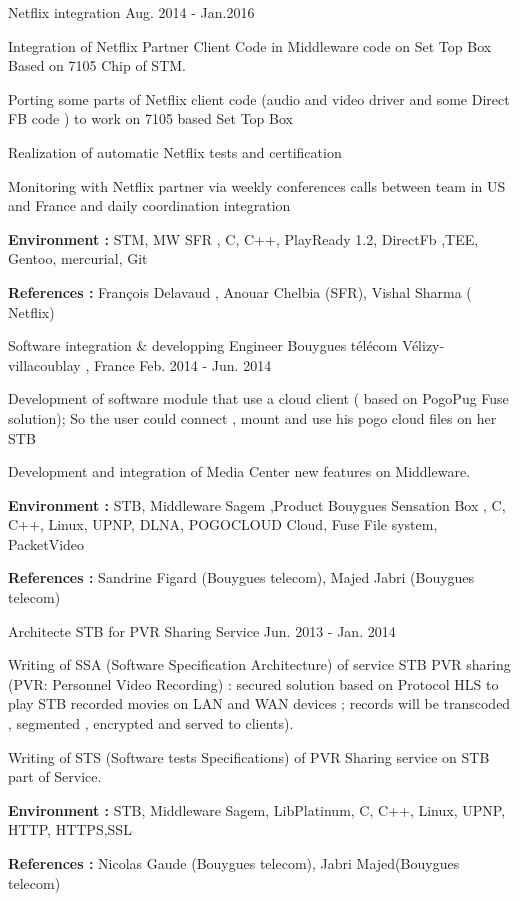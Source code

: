 \begin{cventries}
\cventry
{Netflix integration } %
{}{}
{Aug. 2014 - Jan.2016} %
{ %
\begin{cvitems}
\item {Integration of Netflix Partner Client Code in Middleware code on Set Top Box Based on 7105 Chip of STM.}
\item {Porting some parts of Netflix client code (audio and video driver  and some Direct FB code ) to work on 7105 based Set Top Box}
\item {Realization of automatic Netflix tests and certification }
\item {Monitoring with Netflix partner via weekly conferences calls between team in US and France and daily coordination integration}
\item { \textbf{Environment :}  STM, MW SFR , C, C++, PlayReady 1.2, DirectFb ,TEE, Gentoo, mercurial, Git}
\item { \textbf{References :} François Delavaud , Anouar Chelbia (SFR), Vishal Sharma ( Netflix)}
\end{cvitems}
}

\cventry
{Software integration \& developping Engineer} %
{Bouygues télécom} %
{Vélizy-villacoublay , France} %
{Feb. 2014 - Jun. 2014} %
{ %
\begin{cvitems}
\item {Development of software module that use a cloud client ( based on PogoPug Fuse solution); So the user could connect , mount  and use his pogo cloud files on her STB}
\item {Development and integration of Media Center new features on Middleware.}
\item { \textbf{Environment :} STB, Middleware Sagem ,Product Bouygues Sensation Box ,  C, C++, Linux, UPNP, DLNA, POGOCLOUD Cloud, Fuse File system,  PacketVideo }
\item { \textbf{References :} Sandrine Figard (Bouygues telecom), Majed Jabri (Bouygues telecom) }
\end{cvitems}
}

\cventry
{Architecte STB for PVR Sharing Service} %
{}{}
{Jun. 2013  - Jan. 2014}
{ %
\begin{cvitems}
\item {Writing of SSA  (Software Specification Architecture) of service STB PVR sharing (PVR: Personnel Video Recording)  : secured solution based on Protocol HLS  to play STB recorded movies on LAN and WAN devices ; records will be transcoded , segmented , encrypted and served to clients).}
\item {Writing of STS (Software tests Specifications) of PVR Sharing service on STB part of Service.  }
\item { \textbf{Environment :} STB, Middleware Sagem, LibPlatinum, C, C++, Linux, UPNP, HTTP, HTTPS,SSL }
\item { \textbf{References :}  Nicolas Gaude (Bouygues telecom), Jabri Majed(Bouygues telecom) }
\end{cvitems}
}


\end{cventries}
